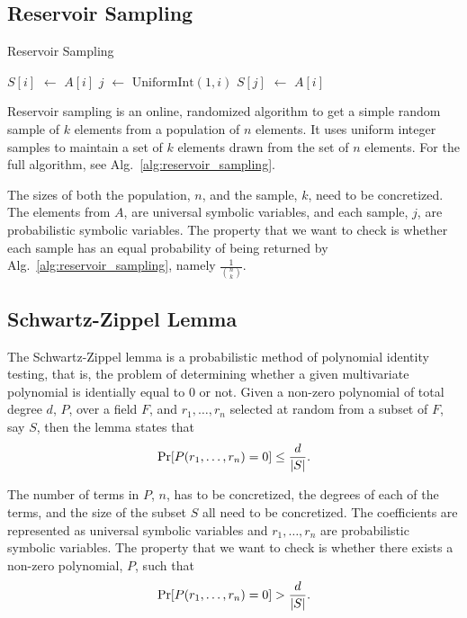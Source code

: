 \documentclass[acmsmall,review]{acmart}\settopmatter{}
\DeclarePairedDelimiter{\abs}{\lvert}{\rvert}
\newcommand*\Let[2]{\State #1 $\gets$ #2}
\begin{document}
	\subsection{Reservoir Sampling}
	\label{sec:reservoir_sampling}
	
	\begin{algorithm}
		\caption{Reservoir Sampling}
		\label{alg:reservoir_sampling}
		\begin{algorithmic}[1]
			\Let{$S[i]$}{$A[i]$}
			\EndFor
			\Let{$j$}{$\mathrm{UniformInt}(1,i)$}
			\Let{$S[j]$}{$A[i]$}
			\EndIf
			\EndFor
			\State{}
			\EndFunction
		\end{algorithmic}
	\end{algorithm}
	
	Reservoir sampling is an online, randomized algorithm to get a simple random sample of $k$ elements from a population of $n$ elements.
	It uses uniform integer samples to maintain a set of $k$ elements drawn from the set of $n$ elements.
	For the full algorithm, see Alg.~\ref{alg:reservoir_sampling}.
	
	
	The sizes of both the population, $n$, and the sample, $k$, need to be concretized.
	The elements from $A$, are universal symbolic variables, and each sample, $j$, are probabilistic symbolic variables.
	The property that we want to check is whether each sample has an equal probability of being returned by Alg.~\ref{alg:reservoir_sampling}, namely $\frac{1}{\binom{n}{k}}$.
	
	\subsection{Schwartz-Zippel Lemma}
	\label{sec:schwartz-zippel}
	
	The Schwartz-Zippel lemma is a probabilistic method of polynomial identity testing, that is, the problem of determining whether a given multivariate polynomial is identially equal to 0 or not.
	Given a non-zero polynomial of total degree $d$, $P$, over a field $F$, and $r_1,\ldots,r_n$ selected at random from a subset of $F$, say $S$, then the lemma states that
	\[
	\Pr[P(r_1,\ldots,r_n) = 0] \leq \frac{d}{\abs{S}}.
	\]
	
	
	The number of terms in $P$, $n$, has to be concretized, the degrees of each of the terms, and the size of the subset $S$ all need to be concretized.
	The coefficients are represented as universal symbolic variables and $r_1,\ldots,r_n$ are probabilistic symbolic variables.
	The property that we want to check is whether there exists a non-zero polynomial, $P$, such that
	\[
	\Pr[P(r_1,\ldots,r_n) = 0] > \frac{d}{\abs{S}}.
	\]
	
\end{document}
